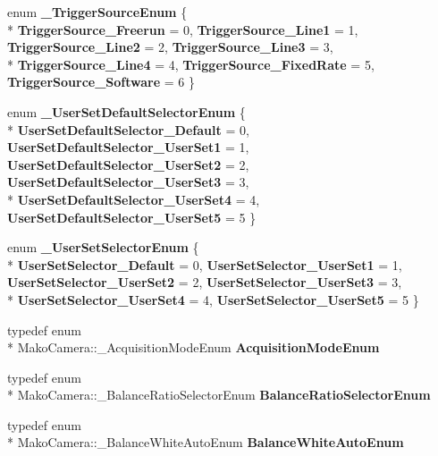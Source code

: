 \begin{DoxyCompactItemize}
enum {\bfseries \-\_\-\-Trigger\-Source\-Enum} \{ \\*
{\bfseries Trigger\-Source\-\_\-\-Freerun} = 0, 
{\bfseries Trigger\-Source\-\_\-\-Line1} = 1, 
{\bfseries Trigger\-Source\-\_\-\-Line2} = 2, 
{\bfseries Trigger\-Source\-\_\-\-Line3} = 3, 
\\*
{\bfseries Trigger\-Source\-\_\-\-Line4} = 4, 
{\bfseries Trigger\-Source\-\_\-\-Fixed\-Rate} = 5, 
{\bfseries Trigger\-Source\-\_\-\-Software} = 6
 \}
\item 
enum {\bfseries \-\_\-\-User\-Set\-Default\-Selector\-Enum} \{ \\*
{\bfseries User\-Set\-Default\-Selector\-\_\-\-Default} = 0, 
{\bfseries User\-Set\-Default\-Selector\-\_\-\-User\-Set1} = 1, 
{\bfseries User\-Set\-Default\-Selector\-\_\-\-User\-Set2} = 2, 
{\bfseries User\-Set\-Default\-Selector\-\_\-\-User\-Set3} = 3, 
\\*
{\bfseries User\-Set\-Default\-Selector\-\_\-\-User\-Set4} = 4, 
{\bfseries User\-Set\-Default\-Selector\-\_\-\-User\-Set5} = 5
 \}
\item 
enum {\bfseries \-\_\-\-User\-Set\-Selector\-Enum} \{ \\*
{\bfseries User\-Set\-Selector\-\_\-\-Default} = 0, 
{\bfseries User\-Set\-Selector\-\_\-\-User\-Set1} = 1, 
{\bfseries User\-Set\-Selector\-\_\-\-User\-Set2} = 2, 
{\bfseries User\-Set\-Selector\-\_\-\-User\-Set3} = 3, 
\\*
{\bfseries User\-Set\-Selector\-\_\-\-User\-Set4} = 4, 
{\bfseries User\-Set\-Selector\-\_\-\-User\-Set5} = 5
 \}
\item 
\hypertarget{classMakoCamera_aeb79ad0812660f8f46ecac228c666c17}{typedef enum \\*
Mako\-Camera\-::\-\_\-\-Acquisition\-Mode\-Enum {\bfseries Acquisition\-Mode\-Enum}}\label{classMakoCamera_aeb79ad0812660f8f46ecac228c666c17}

\item 
\hypertarget{classMakoCamera_ae13abe492fc41509cab64b2bf721acd4}{typedef enum \\*
Mako\-Camera\-::\-\_\-\-Balance\-Ratio\-Selector\-Enum {\bfseries Balance\-Ratio\-Selector\-Enum}}\label{classMakoCamera_ae13abe492fc41509cab64b2bf721acd4}

\item 
\hypertarget{classMakoCamera_ac0246b518e9bb174731f425338bebcc7}{typedef enum \\*
Mako\-Camera\-::\-\_\-\-Balance\-White\-Auto\-Enum {\bfseries Balance\-White\-Auto\-Enum}}\label{classMakoCamera_ac0246b518e9bb174731f425338bebcc7}


\end{DoxyCompactItemize}
